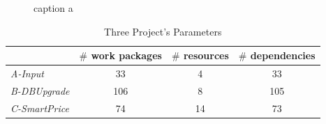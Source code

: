 \begin{figure}[!ht]
  \centering
  \caption{caption a}
  \label{fig:dag}
\end{figure}


% 
\begin{table}[!h]
  \centering
  \caption{Three Project's Parameters}
  \label{tab:statis}
  \begin{tabular}{lccc}
    \hline
      & $\#$ work packages & $\#$ resources & $\#$ dependencies \\
    \hline
    \emph{A-Input}      & 33  & 4  & 33  \\
    \emph{B-DBUpgrade}  & 106 & 8  & 105 \\
    \emph{C-SmartPrice} & 74  & 14 & 73  \\
    \hline
  \end{tabular}
\end{table}


